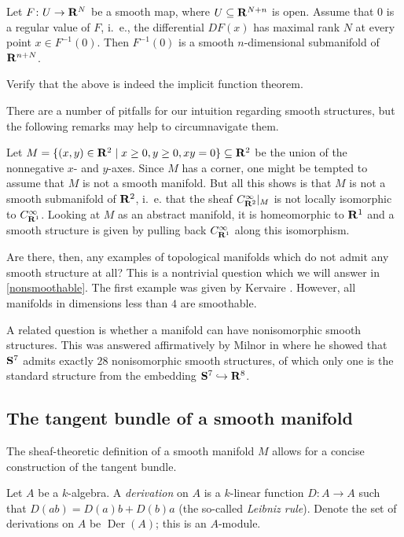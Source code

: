 \documentclass[a4paper,openany]{scrbook}
\DeclareMathOperator{\Der}{Der}
\begin{document}
\begin{thm}
Let $F\colon U \to \R^N$ be a smooth map, where $U \subseteq \R^{N+n}$ is open. Assume that $0$ is a regular value of $F$, i.~e., the differential $DF(x)$ has maximal rank $N$ at every point $x \in F^{-1}(0)$. Then $F^{-1}(0)$ is a smooth $n$-dimensional submanifold of $\R^{n+N}$.
\end{thm}

\begin{exer}
Verify that the above is indeed the implicit function theorem.
\end{exer}

There are a number of pitfalls for our intuition regarding smooth structures, but the following remarks may help to circumnavigate them.

Let $M = \{ (x,y) \in \R^2 \mid x \geq 0, y \geq 0, xy=0\} \subseteq \R^2$ be the union of the nonnegative $x$- and $y$-axes. Since $M$ has a corner, one might be tempted to assume that $M$ is not a smooth manifold. But all this shows is that $M$ is not a smooth submanifold of $\R^2$, i.~e. that the sheaf $C^\infty_{\R^2}|_M$ is not locally isomorphic to $C^\infty_{\R^1}$. Looking at $M$ as an abstract manifold, it is homeomorphic to $\R^1$ and a smooth structure is given by pulling back $C^\infty_{\R^1}$ along this isomorphism.

Are there, then, any examples of topological manifolds which do not admit any smooth structure at all? This is a nontrivial question which we will answer in \ref{nonsmoothable}. The first example was given by Kervaire \cite{kervaire:nonsmoothable}. However, all manifolds in dimensions less than $4$ are smoothable.

A related question is whether a manifold can have nonisomorphic smooth structures. This was answered affirmatively by Milnor in \cite{milnor:7spheres} where he showed that $\S^7$ admits exactly $28$ nonisomorphic smooth structures, of which only one is the standard structure from the embedding $\S^7 \hookrightarrow \R^8$.

\subsection{The tangent bundle of a smooth manifold}

The sheaf-theoretic definition of a smooth manifold $M$ allows for a concise construction of the tangent bundle.

\begin{defn}
Let $A$ be a $k$-algebra. A \emph{derivation} on $A$ is a $k$-linear function $D\colon A \to A$ such that $D(ab) = D(a)b+D(b)a$ (the so-called \emph{Leibniz rule}). Denote the set of derivations on $A$ be $\Der(A)$; this is an $A$-module.
\end{defn}
\end{document}
